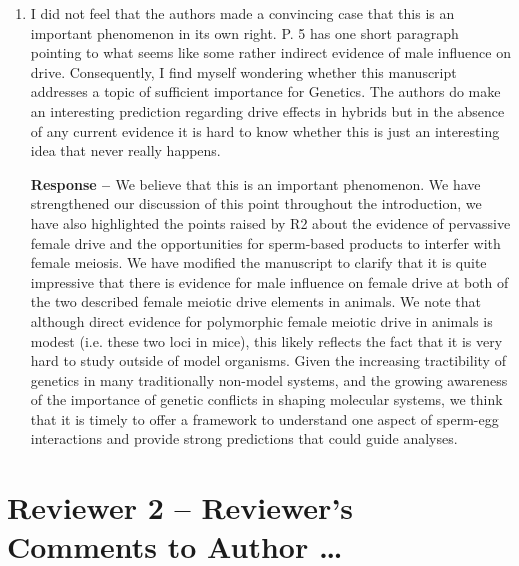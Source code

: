 \documentclass[12pt,letterpaper]{article}
\newcommand{\gc}[1]{{ \color{red} #1}}
\begin{document}
\begin{enumerate}
\item
\begin{singlespace}
I did not feel that the authors made a convincing case that this is an
important phenomenon in its own right.  P. 5 has one short paragraph pointing to
what seems like some rather indirect evidence of male influence on drive.
Consequently, I find myself wondering whether this manuscript addresses a topic
of sufficient importance for Genetics.  The authors do make an interesting
prediction regarding drive effects in hybrids but in the absence of any current
evidence it is hard to know whether this is just an interesting idea that never
really happens. \\
\end{singlespace}

\begin{singlespace}
	{\bf{Response -- }}  \gc{We believe that this is an important
        phenomenon. We have strengthened our discussion of this point
        throughout the introduction,
        we have also highlighted the points raised by R2 about 
        the evidence of pervassive female drive and the opportunities for
        sperm-based products
        to interfer with female meiosis.
	We have modified the manuscript to clarify that it is quite impressive that there is evidence
	for male influence on female drive at both of the two described
        female meiotic drive elements in animals. 
	We note that although direct evidence for polymorphic female meiotic drive
        in animals is modest (i.e. these two loci in mice), 
	this likely reflects the fact that it is very hard to study
        outside of model organisms. 
Given the increasing tractibility of genetics in many traditionally
        non-model systems, and the growing awareness of the importance
        of genetic conflicts in shaping molecular systems, we think
        that it is timely to offer a framework to understand one
        aspect of sperm-egg 
        interactions and provide
strong predictions that could guide analyses.}
\end{singlespace}
\end{enumerate}

\newpage

\section*{Reviewer 2 -- Reviewer's Comments to Author \dots}
\end{document}
